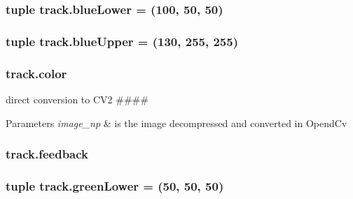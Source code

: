 \subsubsection[{\texorpdfstring{blue\+Lower}{blueLower}}]{\setlength{\rightskip}{0pt plus 5cm}tuple track.\+blue\+Lower = (100, 50, 50)}\hypertarget{namespacetrack_a222fd73291da99272b344d9089ce0fde}{}\label{namespacetrack_a222fd73291da99272b344d9089ce0fde}
\subsubsection[{\texorpdfstring{blue\+Upper}{blueUpper}}]{\setlength{\rightskip}{0pt plus 5cm}tuple track.\+blue\+Upper = (130, 255, 255)}\hypertarget{namespacetrack_ae6e375645538a7968d81c8ebe9ee5b7d}{}\label{namespacetrack_ae6e375645538a7968d81c8ebe9ee5b7d}
\subsubsection[{\texorpdfstring{color}{color}}]{\setlength{\rightskip}{0pt plus 5cm}track.\+color}\hypertarget{namespacetrack_aa2f40726487fc336af892381448898a5}{}\label{namespacetrack_aa2f40726487fc336af892381448898a5}


direct conversion to C\+V2 \#\#\#\# 


\begin{DoxyParams}{Parameters}
{\em image\+\_\+np} & is the image decompressed and converted in Opend\+Cv \\
\hline
\end{DoxyParams}
\subsubsection[{\texorpdfstring{feedback}{feedback}}]{\setlength{\rightskip}{0pt plus 5cm}track.\+feedback}\hypertarget{namespacetrack_a99bdf85519e387c8c0c7612a0b46dc56}{}\label{namespacetrack_a99bdf85519e387c8c0c7612a0b46dc56}
\subsubsection[{\texorpdfstring{green\+Lower}{greenLower}}]{\setlength{\rightskip}{0pt plus 5cm}tuple track.\+green\+Lower = (50, 50, 50)}\hypertarget{namespacetrack_ae3b9cb19e6647fa48bae473c1b3152ea}{}\label{namespacetrack_ae3b9cb19e6647fa48bae473c1b3152ea}
